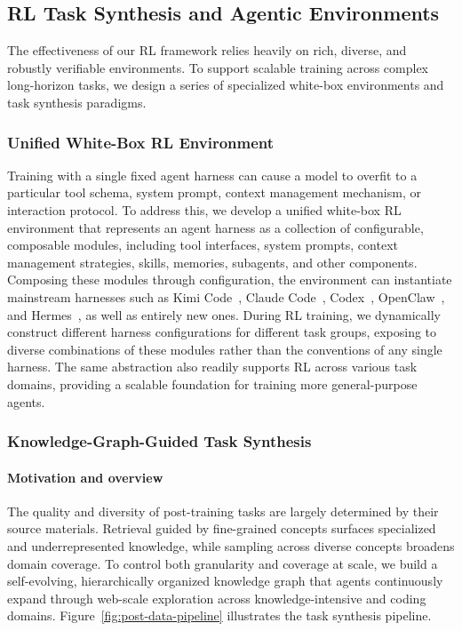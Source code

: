 \subsection{RL Task Synthesis and Agentic Environments}
\label{sec:post-envs}

The effectiveness of our RL framework relies heavily on rich, diverse, and robustly verifiable environments. To support scalable training across complex long-horizon tasks, we design a series of specialized white-box environments and task synthesis paradigms.

\subsubsection{Unified White-Box RL Environment}

Training with a single fixed agent harness can cause a model to overfit to a particular tool schema, system prompt, context management mechanism, or interaction protocol. To address this, we develop a unified white-box RL environment that represents an agent harness as a collection of configurable, composable modules, including tool interfaces, system prompts, context management strategies, skills, memories, subagents, and other components. Composing these modules through configuration, the environment can instantiate mainstream harnesses such as Kimi Code~\citep{kimicode}, Claude Code~\citep{claudecode}, Codex~\citep{openaicodex}, OpenClaw~\citep{openclaw}, and Hermes~\citep{hermesagent}, as well as entirely new ones. During RL training, we dynamically construct different harness configurations for different task groups,  exposing  to diverse combinations of these modules rather than the conventions of any single harness. The same abstraction also readily supports RL across various task domains, providing a scalable foundation for training more general-purpose agents.

\subsubsection{Knowledge-Graph-Guided Task Synthesis}
\label{sec:post-data}

\paragraph{Motivation and overview}
The quality and diversity of post-training tasks are largely determined by their source materials. Retrieval guided by fine-grained concepts surfaces specialized and underrepresented knowledge, while sampling across diverse concepts broadens domain coverage. To control both granularity and coverage at scale, we build a self-evolving, hierarchically organized knowledge graph that agents continuously expand through web-scale exploration across knowledge-intensive and coding domains. Figure~\ref{fig:post-data-pipeline} illustrates the task synthesis pipeline.

